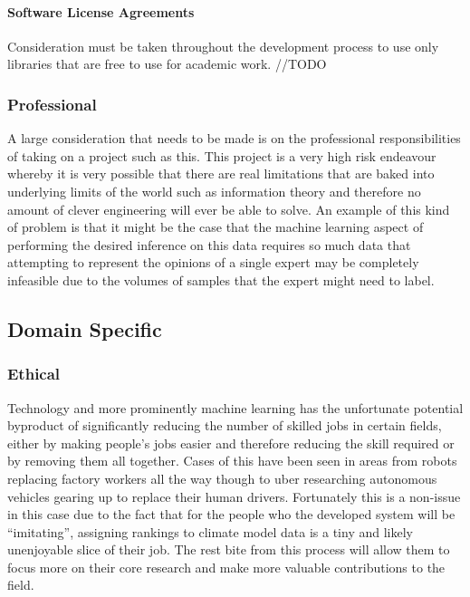 \documentclass[11pt]{article} %
\numberwithin{equation}{section}
\begin{document}
\paragraph{Software License Agreements}

Consideration must be taken throughout the development process to use
only libraries that are free to use for academic work. //TODO

\subsubsection{Professional}

A large consideration that needs to be made is on the professional
responsibilities of taking on a project such as this. This project
is a very high risk endeavour whereby it is very possible that there
are real limitations that are baked into underlying limits of the world
such as information theory and therefore no amount of clever engineering
will ever be able to solve. An example of this kind of problem is
that it might be the case that the machine learning aspect of performing
the desired inference on this data requires so much data that attempting
to represent the opinions of a single expert may be completely infeasible
due to the volumes of samples that the expert might need to label. 

\subsection{Domain Specific}

\subsubsection{Ethical}

Technology and more prominently machine learning has the unfortunate
potential byproduct of significantly reducing the number of skilled
jobs in certain fields, either by making people's jobs easier and
therefore reducing the skill required or by removing them all together.
Cases of this have been seen in areas from robots replacing factory
workers all the way though to uber researching autonomous vehicles
gearing up to replace their human drivers. Fortunately this is a non-issue
in this case due to the fact that for the people who the developed
system will be ``imitating'', assigning rankings to climate model
data is a tiny and likely unenjoyable slice of their job. The rest bite
from this process will allow them to focus more on their core research
and make more valuable contributions to the field. 
\end{document}
